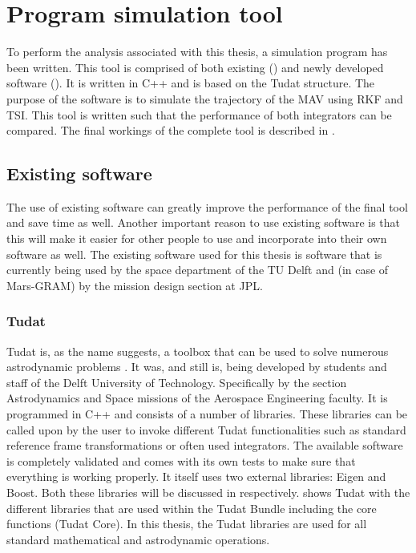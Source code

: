 \chapter{Program simulation tool} 

\label{ch:programSimulationTool}
To perform the analysis associated with this thesis, a simulation program has been written. This tool is comprised of both existing () and newly developed software (). It is written in C++ and is based on the \ac{Tudat} structure. The purpose of the software is to simulate the trajectory of the \ac{MAV} using \ac{RKF} and \ac{TSI}. This tool is written such that the performance of both integrators can be compared. The final workings of the complete tool is described in .

\section{Existing software}
\label{sec:existingsoftware}
The use of existing software can greatly improve the performance of the final tool and save time as well. Another important reason to use existing software is that this will make it easier for other people to use and incorporate into their own software as well. The existing software used for this thesis is software that is currently being used by the space department of the TU Delft and (in case of Mars-\ac{GRAM}) by the mission design section at \ac{JPL}. 


\subsection{\ac{Tudat}}
\label{subsec:tudat}
\ac{Tudat} is, as the name suggests, a toolbox that can be used to solve numerous astrodynamic problems \citep{dirkx2016tudat}. It was, and still is, being developed by students and staff of the Delft University of Technology. Specifically by the section Astrodynamics and Space missions of the Aerospace Engineering faculty. It is programmed in C++ and consists of a number of libraries. These libraries can be called upon by the user to invoke different \ac{Tudat} functionalities such as standard reference frame transformations or often used integrators. The available software is completely validated and comes with its own tests to make sure that everything is working properly. It itself uses two external libraries: Eigen and Boost. Both these libraries will be discussed in  respectively.  shows \ac{Tudat} with the different libraries that are used within the \ac{Tudat} Bundle including the core functions (\ac{Tudat} Core).
In this thesis, the \ac{Tudat} libraries are used for all standard mathematical and astrodynamic operations.

